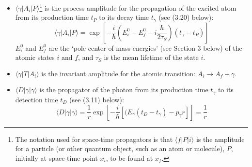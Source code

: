 \documentclass [12pt]{article}
\begin{document}
{\begin{itemize}
    \item $\langle\gamma|A_i|P\rangle$\footnote{The notation used for space-time propagators
    is that $\langle f |P|i\rangle$ is the amplitude for a particle (or other quantum object, such as an atom or
   molecule), $P$, initially at space-time point $x_i$, to be found at $x_f$.} is the process amplitude for
     the propagation of the excited atom from its production time $t_P$ to its decay time
    $t_{\gamma}$ (see (3.20) below):
  \begin{equation}
   \langle\gamma|A_i|P\rangle = \exp\left[-\frac{i}{\hbar}
    (E_i^0-E_f^0-i\frac{\hbar}{2 \tau_S})(t_{\gamma}-t_P)\right]
   \end{equation}
    $E_i^0$ and $E_f^0$ are the `pole center-of-mass energies' (see Section 3 below) of the atomic states
    $i$ and $f$, and $\tau_S$ is the mean lifetime of the state $i$.
    \item $\langle\gamma|T|A_i\rangle$ is the invariant amplitude for the atomic transition:
    $A_i \rightarrow A_f + \gamma$. 
     \item  $\langle D|\gamma|\gamma\rangle$  is the propagator of the photon from its 
    production time $t_{\gamma}$ to its detection time $t_D$ (see (3.11) below):
    \begin{equation}
    \langle D|\gamma|\gamma\rangle = \frac{1}{r}\exp\left[-\frac{i}{\hbar}
     [(E_{\gamma}(t_D-t_{\gamma})-p_\gamma r]\right] =  \frac{1}{r}
   \end{equation}


\end{itemize}}
\end{document}
